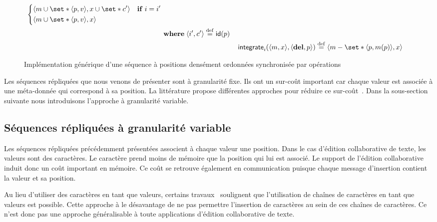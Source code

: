 \begin{figure}[htb]
\begin{align}
\begin{aligned}
\begin{dcases}
    \tuple*{m \cup \set*{\tuple*{p, v}}, x \cup \set*{c'}} & \when i = i'\\
    \tuple*{m \cup \set*{\tuple*{p, v}}, x} &
\end{dcases}\\
&\where \tuple*{i', c'} \defeq \trm{id}(p)
\end{aligned}\label{eq:op-seq-integr-ins}\\
%
&\trm{integrate}_i(\tuple*{m, x}, \tuple*{\textbf{del}, p}) \defeq%
\tuple*{m \sminus \set*{\tuple*{p, m(p)}}, x}%
\label{eq:op-seq-integr-del}
%
\end{align}
\caption{Implémentation générique d'une séquence à positions densément ordonnées synchronisée par opérations}\label{fig:op-densely-id-repseq}
\end{figure}

Les séquences répliquées que nous venons de présenter sont à granularité fixe.
Ils ont un sur-coût important car chaque valeur est associée à une méta-donnée qui correspond à sa position.
La littérature propose différentes approches pour réduire ce sur-coût~\autocite{ andre_2013_logootsplit, briot_2016_rgasplit,nedelec_2013_lseq,nicolas2020_renaming}.
Dans la sous-section suivante nous introduisons l'approche à granularité variable.

\clearpage
\subsection{Séquences répliquées à granularité variable}\label{subsec:strwise-seq}

Les séquences répliquées précédemment présentées associent à chaque valeur une position.
Dans le cas d'édition collaborative de texte, les valeurs sont des caractères.
Le caractère prend moins de mémoire que la position qui lui est associé.
Le support de l'édition collaborative induit donc un coût important en mémoire.
Ce coût se retrouve également en communication puisque chaque message d'insertion contient la valeur et sa position.

Au lieu d'utiliser des caractères en tant que valeurs, certains travaux~\autocite{oster_2006_woot} soulignent que l'utilisation de chaînes de caractères en tant que valeurs est possible.
Cette approche à le désavantage de ne pas permettre l'insertion de caractères au sein de ces chaînes de caractères.
Ce n'est donc pas une approche généralisable à toute applications d'édition collaborative de texte.

